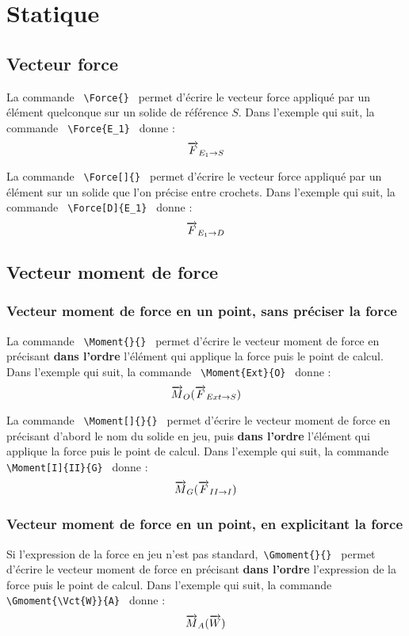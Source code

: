 \documentclass[12pt]{article}
\begin{document}
\newpage

\section{Statique}

\subsection{Vecteur force}
La commande \verb| \Force{} | permet d'écrire le vecteur force appliqué par un élément quelconque sur un solide de référence $S$. Dans l'exemple qui suit, la commande \verb| \Force{E_1} | donne : $$\Force{E_1}$$

La commande \verb| \Force[]{} | permet d'écrire le vecteur force appliqué par un élément sur un solide que l'on précise entre crochets. Dans l'exemple qui suit, la commande \verb| \Force[D]{E_1} | donne : $$\Force[D]{E_1}$$

\subsection{Vecteur moment de force}

\subsubsection{Vecteur moment de force en un point, sans préciser la force}
La commande \verb| \Moment{}{} | permet d'écrire le vecteur moment de force en précisant \textbf{dans l'ordre} l'élément qui applique la force puis le point de calcul. Dans l'exemple qui suit, la commande \verb| \Moment{Ext}{O} | donne : $$\Moment{Ext}{O}$$

La commande \verb| \Moment[]{}{} | permet d'écrire le vecteur moment de force en précisant d'abord le nom du solide en jeu, puis \textbf{dans l'ordre} l'élément qui applique la force puis le point de calcul. Dans l'exemple qui suit, la commande \verb| \Moment[I]{II}{G} | donne : $$\Moment[I]{II}{G}$$

\subsubsection{Vecteur moment de force en un point, en explicitant la force}
Si l'expression de la force en jeu n'est pas standard,\verb| \Gmoment{}{} | permet d'écrire le vecteur moment de force en précisant \textbf{dans l'ordre} l'expression de la force puis le point de calcul. Dans l'exemple qui suit, la commande \verb| \Gmoment{\Vct{W}}{A} | donne : $$\Gmoment{\Vct{W}}{A}$$
\end{document}

